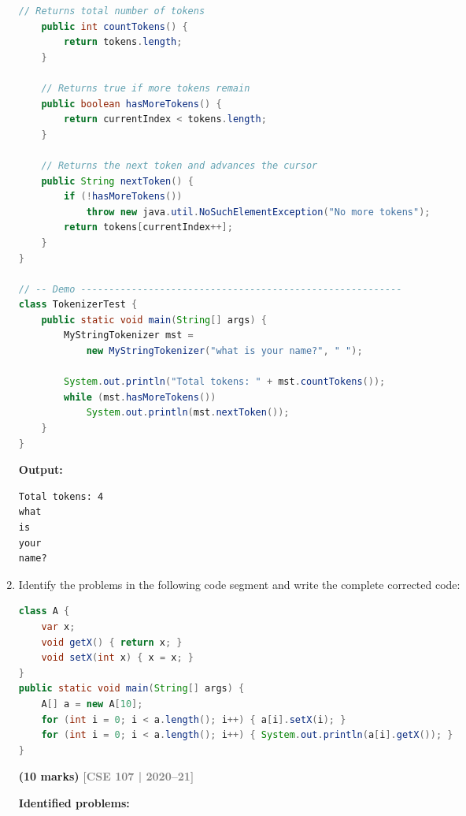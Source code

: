 \documentclass[12pt,a3paper]{article}
\newcommand{\yr}[1]{\hfill\textcolor{gray}{\small\textbf{[#1]}}}
\newcommand{\mk}[1]{\textcolor{orange!70!black}{\small\textbf{(#1 marks)}}}
\begin{document}
\begin{enumerate}
\begin{tcolorbox}[enhanced,breakable,ansbox,
  colback=cB!4,colframe=cB,boxrule=0.8pt,arc=5pt,
  title={\textbf{Answer --- \texttt{MyStringTokenizer} Class}},
  fonttitle=\bfseries\color{white},colbacktitle=cB]
\begin{lstlisting}[language=Java]
    // Returns total number of tokens
    public int countTokens() {
        return tokens.length;
    }

    // Returns true if more tokens remain
    public boolean hasMoreTokens() {
        return currentIndex < tokens.length;
    }

    // Returns the next token and advances the cursor
    public String nextToken() {
        if (!hasMoreTokens())
            throw new java.util.NoSuchElementException("No more tokens");
        return tokens[currentIndex++];
    }
}

// -- Demo ---------------------------------------------------------
class TokenizerTest {
    public static void main(String[] args) {
        MyStringTokenizer mst =
            new MyStringTokenizer("what is your name?", " ");

        System.out.println("Total tokens: " + mst.countTokens());
        while (mst.hasMoreTokens())
            System.out.println(mst.nextToken());
    }
}
\end{lstlisting}

\textbf{Output:}
\begin{lstlisting}
Total tokens: 4
what
is
your
name?
\end{lstlisting}

\end{tcolorbox}

\item Identify the problems in the following code segment and write the complete corrected code:
\begin{lstlisting}[language=Java]
class A {
    var x;
    void getX() { return x; }
    void setX(int x) { x = x; }
}
public static void main(String[] args) {
    A[] a = new A[10];
    for (int i = 0; i < a.length(); i++) { a[i].setX(i); }
    for (int i = 0; i < a.length(); i++) { System.out.println(a[i].getX()); }
}
\end{lstlisting}
\mk{10}
\yr{CSE 107 | 2020--21}

\begin{tcolorbox}[enhanced,breakable,ansbox,
  colback=cB!4,colframe=cB,boxrule=0.8pt,arc=5pt,
  title={\textbf{Answer --- Problems in \texttt{class A} \& Corrected Code}},
  fonttitle=\bfseries\color{white},colbacktitle=cB]

\textbf{Identified problems:}


\end{tcolorbox}
\end{enumerate}
\end{document}
